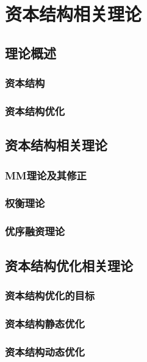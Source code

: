 \chapter{资本结构相关理论}
\section{理论概述}
\subsection{资本结构}
\subsection{资本结构优化}
\section{资本结构相关理论}
\subsection{MM理论及其修正}
\subsection{权衡理论}
\subsection{优序融资理论}
\section{资本结构优化相关理论}
\subsection{资本结构优化的目标}
\subsection{资本结构静态优化}
\subsection{资本结构动态优化}